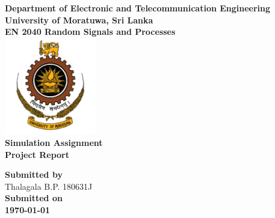 \begin{titlepage}
\center %

\textbf{\large Department of Electronic and Telecommunication Engineering}\\[0.5cm]
\textbf{\Large University of Moratuwa, Sri Lanka}\\[1cm]
\textbf{\large EN 2040 Random Signals and Processes}\\[2cm]
\includegraphics[width=0.3\textwidth]{figures/uomlogo}\\[2cm]

	
\textbf{\Huge Simulation Assignment }\\[0.2cm]
\textbf{\Large Project Report}\\[5cm]




\vfill

\textbf{\large Submitted by}\\[0.5cm]

{\large Thalagala B.P.}	\hspace{5mm} {\large 180631J }\\[1cm]


\textbf{\large Submitted on}\\[0.5cm]
\textbf{\Large \today} %


\vfill %

\end{titlepage}